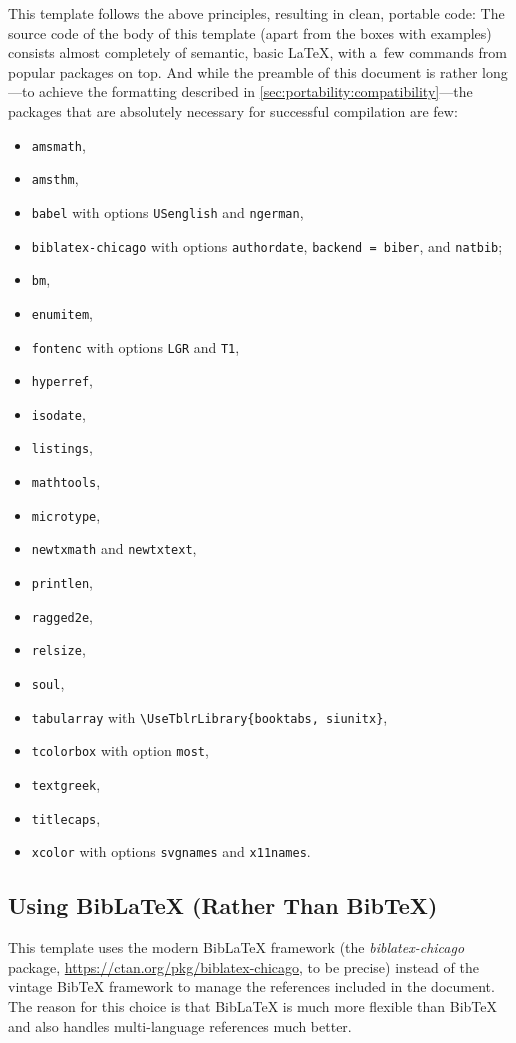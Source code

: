 \documentclass[12pt, a4paper, oneside]{article}
\theoremstyle{Plain}
\theoremstyle{Definition}
\theoremstyle{Remark}
\begin{document}
This template follows the above principles, resulting in clean, portable code: The source code of the body of this template (apart from the boxes with examples) consists almost completely of semantic, basic LaTeX, with a~few commands from popular packages on top. And while the preamble of this document is rather long---to achieve the formatting described in \autoref{sec:portability:compatibility}---the packages that are absolutely necessary for successful compilation are few:
\begin{itemize}
	\item \verb|amsmath|,
	\item \verb|amsthm|,
	\item \verb|babel| with options \verb|USenglish| and \verb|ngerman|,
	\item \verb|biblatex-chicago| with options \verb|authordate|, \verb|backend = biber|, and \verb|natbib|;
	\item \verb|bm|,
	\item \verb|enumitem|,
	\item \verb|fontenc| with options \verb|LGR| and \verb|T1|,
	\item \verb|hyperref|,
	\item \verb|isodate|,
	\item \verb|listings|,
	\item \verb|mathtools|,
	\item \verb|microtype|,
	\item \verb|newtxmath| and \verb|newtxtext|,
	\item \verb|printlen|,
	\item \verb|ragged2e|,
	\item \verb|relsize|,
	\item \verb|soul|,
	\item \verb|tabularray| with \verb|\UseTblrLibrary{booktabs, siunitx}|,
	\item \verb|tcolorbox| with option \verb|most|,
	\item \verb|textgreek|,
	\item \verb|titlecaps|,
	\item \verb|xcolor| with options \verb|svgnames| and \verb|x11names|.
\end{itemize}

\subsection{Using BibLaTeX (Rather Than BibTeX)}

This template uses the modern BibLaTeX framework (the \textit{biblatex-chicago} package, \url{https://ctan.org/pkg/biblatex-chicago}, to be precise) instead of the vintage BibTeX framework to manage the references included in the document. The reason for this choice is that BibLaTeX is much more flexible than BibTeX and also handles multi-language references much better.
\end{document}
